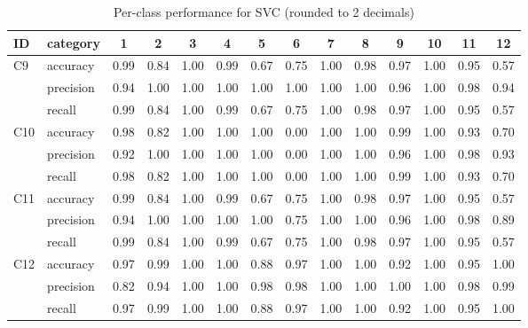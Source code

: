 \documentclass[11pt]{article}
\begin{document}
\begin{table} [h]
  \centering
  \begin{tabular}{llcccccccccccc}
      \toprule
      ID & category & 1 & 2 & 3 & 4 & 5 & 6 & 7 & 8 & 9 & 10 & 11 & 12 \\
      \midrule

      \multirow{3}{*}{C9}
        & accuracy  & 0.99 & 0.84 & 1.00 & 0.99 & 0.67 & 0.75 & 1.00 & 0.98 & 0.97 & 1.00 & 0.95 & 0.57 \\
        & precision & 0.94 & 1.00 & 1.00 & 1.00 & 1.00 & 1.00 & 1.00 & 1.00 & 0.96 & 1.00 & 0.98 & 0.94 \\
        & recall    & 0.99 & 0.84 & 1.00 & 0.99 & 0.67 & 0.75 & 1.00 & 0.98 & 0.97 & 1.00 & 0.95 & 0.57 \\
      \midrule

      \multirow{3}{*}{C10}
        & accuracy  & 0.98 & 0.82 & 1.00 & 1.00 & 1.00 & 0.00 & 1.00 & 1.00 & 0.99 & 1.00 & 0.93 & 0.70 \\
        & precision & 0.92 & 1.00 & 1.00 & 1.00 & 1.00 & 0.00 & 1.00 & 1.00 & 0.96 & 1.00 & 0.98 & 0.93 \\
        & recall    & 0.98 & 0.82 & 1.00 & 1.00 & 1.00 & 0.00 & 1.00 & 1.00 & 0.99 & 1.00 & 0.93 & 0.70 \\
      \midrule

      \multirow{3}{*}{C11}
        & accuracy  & 0.99 & 0.84 & 1.00 & 0.99 & 0.67 & 0.75 & 1.00 & 0.98 & 0.97 & 1.00 & 0.95 & 0.57 \\
        & precision & 0.94 & 1.00 & 1.00 & 1.00 & 1.00 & 0.75 & 1.00 & 1.00 & 0.96 & 1.00 & 0.98 & 0.89 \\
        & recall    & 0.99 & 0.84 & 1.00 & 0.99 & 0.67 & 0.75 & 1.00 & 0.98 & 0.97 & 1.00 & 0.95 & 0.57 \\
      \midrule

      \multirow{3}{*}{C12}
        & accuracy  & 0.97 & 0.99 & 1.00 & 1.00 & 0.88 & 0.97 & 1.00 & 1.00 & 0.92 & 1.00 & 0.95 & 1.00 \\
        & precision & 0.82 & 0.94 & 1.00 & 1.00 & 0.98 & 0.98 & 1.00 & 1.00 & 1.00 & 1.00 & 0.98 & 0.99 \\
        & recall    & 0.97 & 0.99 & 1.00 & 1.00 & 0.88 & 0.97 & 1.00 & 1.00 & 0.92 & 1.00 & 0.95 & 1.00 \\
    \bottomrule
  \end{tabular}
  \caption{Per-class performance for SVC (rounded to 2 decimals)}
  \label{tab:table4}
\end{table}
\end{document}
